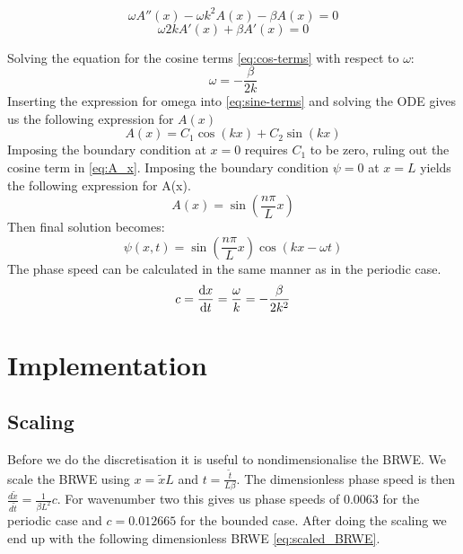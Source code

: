 \begin{equation}\label{eq:sine-terms}
    \omega A''(x) -\omega k^2 A(x) - \beta A(x) = 0
\end{equation}
\begin{equation}\label{eq:cos-terms}
    \omega 2 k A'(x) + \beta A'(x) = 0
\end{equation}

Solving the equation for the cosine terms \cref{eq:cos-terms} with respect to
$\omega$:
\begin{equation}
    \omega = -\frac{\beta}{2k}
\end{equation}
Inserting the expression for omega into \cref{eq:sine-terms} and solving the ODE
gives us the following expression for $A(x)$
\begin{equation}\label{eq:A_x}
    A(x) = C_1 \cos{(kx) + C_2 \sin{(kx)}}
\end{equation}
Imposing the boundary condition at $x=0$ requires $C_1$ to be zero, ruling
out the cosine term in \cref{eq:A_x}. Imposing the boundary condition $\psi=0$
at $x=L$ yields the following expression for A(x).
\begin{equation}
    A(x) = \sin{\left(\frac{n\pi}{L} x \right)}
\end{equation}
Then final solution becomes:
\begin{equation}
    \psi(x,t) = \sin{\left(\frac{n\pi}{L} x \right)} \cos{(kx - \omega t)}
\end{equation}
The phase speed can be calculated in the same manner as in the periodic case.
\begin{equation}
    c = \dv{x}{t} = \frac{\omega}{k} = -\frac{\beta}{2k^2}
\end{equation}



\section{Implementation}


\subsection{Scaling}
Before we do the discretisation it is useful to nondimensionalise the BRWE.
We scale the BRWE using $x = \tilde{x} L $ and $t = \frac{\tilde{t}}{L \beta}$. The dimensionless phase speed is then $\frac{d\tilde{x}}{d\tilde{t}} = \frac{1}{\beta L^2} c$. For wavenumber two this gives us phase speeds of
$0.0063$ for the periodic case and $c = 0.012665$ for the bounded case.
After doing the scaling we end up with the following dimensionless BRWE \cref{eq:scaled_BRWE}.

